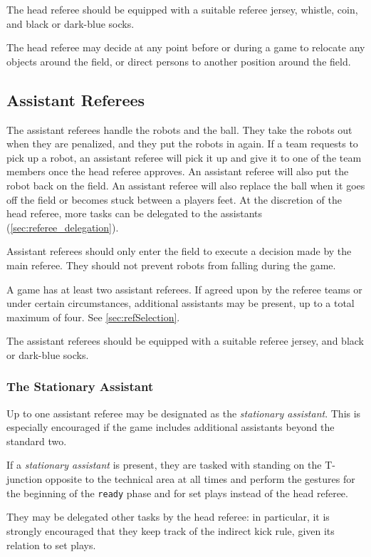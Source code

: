 The head referee should be equipped with a suitable referee jersey, whistle, coin, and black or dark-blue socks.

The head referee may decide at any point before or during a game to relocate any objects around the field, or direct persons to another position around the field.

\subsection{Assistant Referees}
\label{sec:assist_referee}

The assistant referees handle the robots and the ball.
They take the robots out when they are penalized, and they put the robots in again.
If a team requests to pick up a robot, an assistant referee will pick it up and give it to one of the team members once the head referee approves.
An assistant referee will also put the robot back on the field.
An assistant referee will also replace the ball when it goes off the field or becomes stuck between a players feet.
At the discretion of the head referee, more tasks can be delegated to the assistants (\cref{sec:referee_delegation}).

Assistant referees should only enter the field to execute a decision made by the main referee.
They should not prevent robots from falling during the game.

A game has at least two assistant referees. If agreed upon by the referee teams
or under certain circumstances, additional assistants may be present,
up to a total maximum of four. See \cref{sec:refSelection}.

The assistant referees should be equipped with a suitable referee jersey, and black or dark-blue socks.

\subsubsection{The Stationary Assistant}

Up to one assistant referee may be designated as the \textit{stationary assistant}.
This is especially encouraged if the game includes additional assistants
beyond the standard two.

If a \textit{stationary assistant} is present, they are tasked with standing
on the T-junction opposite to the technical area at all times and perform
the gestures for the beginning of the \texttt{ready} phase and for set plays
instead of the head referee.

They may be delegated other tasks by the head referee: in particular, it is strongly
encouraged that they keep track of the indirect kick rule, given its relation
to set plays.

